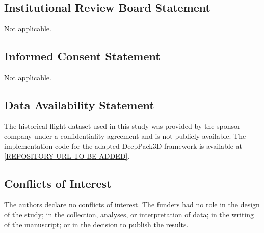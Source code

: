 \subsection*{Institutional Review Board Statement}
Not applicable.

\subsection*{Informed Consent Statement}
Not applicable.

\subsection*{Data Availability Statement}
The historical flight dataset used in this study was provided by the
sponsor company under a confidentiality agreement and is not publicly
available.
The implementation code for the adapted DeepPack3D framework is
available at \url{[REPOSITORY URL TO BE ADDED]}.

\subsection*{Conflicts of Interest}
The authors declare no conflicts of interest.
The funders had no role in the design of the study; in the collection,
analyses, or interpretation of data; in the writing of the manuscript;
or in the decision to publish the results.





